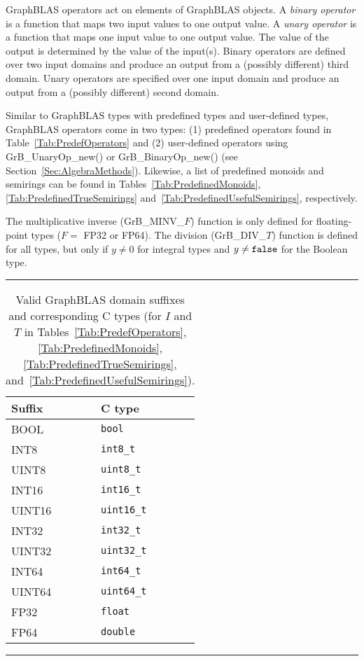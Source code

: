 GraphBLAS operators act on elements of GraphBLAS objects. A \emph{binary operator} is a function that maps two input values to one output value. A \emph{unary operator} is a function that 
maps one input value to one output value. The value of the output is 
determined by the value of the input(s).  Binary operators are defined over 
two input domains and produce an output from a (possibly different) third 
domain. Unary operators are specified over one input domain and produce an 
output from a (possibly different) second domain.

Similar to GraphBLAS types with predefined types and user-defined types, 
GraphBLAS operators come in two types: (1) predefined operators 
found in Table~\ref{Tab:PredefOperators} and (2) user-defined operators 
using {\sf GrB\_UnaryOp\_new()} or {\sf GrB\_BinaryOp\_new()} (see 
Section~\ref{Sec:AlgebraMethods}).  Likewise, a list of predefined monoids and 
semirings can be found in Tables~\ref{Tab:PredefinedMonoids},
\ref{Tab:PredefinedTrueSemirings}
and~\ref{Tab:PredefinedUsefulSemirings}, respectively.

The multiplicative inverse ({\sf GrB\_MINV\_$F$}) function is
only defined for floating-point types ($F = $ {\sf FP32} or {\sf FP64}).
The division ({\sf GrB\_DIV\_$T$}) function is
defined for all types, but only if $y \neq 0$ for integral types
and $y \neq {\tt false}$ for the Boolean type.


\begin{table}
\hrule
\begin{center}
\caption{Valid GraphBLAS domain suffixes and corresponding C types (for $I$ and 
$T$ in Tables~\ref{Tab:PredefOperators}, \ref{Tab:PredefinedMonoids}, 
	\ref{Tab:PredefinedTrueSemirings}, 
and~\ref{Tab:PredefinedUsefulSemirings}).}
\label{Tab:PredefinedDomains}

\vspace{1\baselineskip}

\begin{tabular}{l|l}
Suffix			& C type \\ \hline
{\sf BOOL}		& {\tt bool} \\
{\sf INT8}		& {\tt int8\_t} \\
{\sf UINT8}		& {\tt uint8\_t} \\
{\sf INT16}		& {\tt int16\_t} \\
{\sf UINT16}		& {\tt uint16\_t} \\
{\sf INT32}		& {\tt int32\_t} \\
{\sf UINT32}		& {\tt uint32\_t} \\
{\sf INT64}		& {\tt int64\_t} \\
{\sf UINT64}		& {\tt uint64\_t} \\
{\sf FP32}		& {\tt float} \\
{\sf FP64}		& {\tt double} \\
\end{tabular}
\end{center}
\hrule
\end{table}

